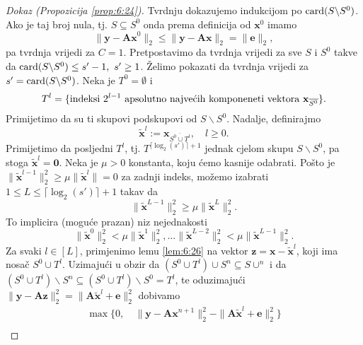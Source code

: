 \documentclass[a4paper,twoside,12pt]{memoir} %
\newcommand{\vect}[1]{\mathbf{#1}}
\renewcommand{\vec}{\vect}
\newcommand{\card}{\text{\normalfont{card}}}
\newcommand{\norm}[1]{\|{#1}\|}
\begin{document}
\begin{proof}[Dokaz (Propozicija \ref{prop:6:24})]
    Tvrdnju dokazujemo indukcijom po $\card(S \backslash S^0)$. Ako je taj broj nula, tj. $S \subseteq S^0$ onda prema definicija od $\vec x^0$ imamo
    \begin{equation*}
        \norm{\vec y - \vec{Ax}^0}_2 \leq \norm{\vec y - \vec{Ax}}_2 = \norm{\vec e}_2, 
    \end{equation*}
    pa tvrdnja vrijedi za $C=1$. Pretpostavimo da tvrdnja vrijedi za sve $S$ i $S^0$ takve da $\card(S \backslash S^0) \leq s'-1,\ s' \geq 1$. \v{Z}elimo pokazati da tvrdnja vrijedi za $s' = \card(S \backslash S^0)$. Neka je $T^0 = \emptyset$ i 
    \begin{equation*}
        T^l = \{\text{indeksi $ 2^{l-1}$ apsolutno najve\'cih komponeneti vektora }\vec x_{\overline{S^0}}\}. 
    \end{equation*}
    Primijetimo da su ti skupovi podskupovi od $S \backslash S^0$. Nadalje, definirajmo
    \begin{equation*}
        \tilde{\vec x}^l := \vec x_{\overline{S^0 \cup T^l}}, \quad l \geq 0.
    \end{equation*}
    Primijetimo da posljedni $T^l$, tj. $T^{\lceil \log_2(s')\rceil + 1}$ jednak cjelom skupu $S \backslash S^0$, pa stoga $\tilde{\vec x}^l = \vec 0$. Neka je $\mu > 0$ konstanta, koju \'cemo kasnije odabrati. Po\v{s}to je $\norm{\tilde{\vec x}^{l-1}}_2^2 \geq \mu \norm{\tilde{\vec x}^l} = 0$ za zadnji indeks, mo\v{z}emo izabrati $1 \leq L \leq \lceil \log_2(s')\rceil + 1$ takav da
    \begin{equation*}
        \norm{\tilde{\vec x}^{L-1}}_2^2 \geq \mu \norm{\tilde{\vec x}^L}_2^2. 
    \end{equation*}
    To implicira (mogu\'ce prazan) niz nejednakosti
    \begin{equation*}
        \norm{\tilde{\vec x}^0}_2^2 < \mu \norm{\tilde{\vec x}^1}_2^2, \dots \norm{\tilde{\vec x}^{L-2}}_2^2 < \mu \norm{\tilde{\vec x}^{L-1}}_2^2.
    \end{equation*}
    Za svaki $l \in [L]$, primjenimo lemu \ref{lem:6:26} na vektor $\vec z = \vec x - \tilde{\vec x}^l$, koji ima nosa\v{c} $S^0 \cup T^l$. Uzimaju\'ci u obzir da $(S^0 \cup T^l) \cup S^n \subseteq S \cup ^n$ i da $(S^0 \cup T^l) \backslash S^n \subseteq (S^0 \cup T^l) \backslash S^0 = T^l$, te oduzimaju\'ci $\norm{\vec y - \vec{Az}}_2^2 = \norm{\vec A \tilde{\vec x}^l + \vec e}_2^2$ dobivamo
    \begin{align*}
        \max \{0,&\ \norm{\vec y - \vec{Ax}^{n+1}}_2^2 - \norm{\vec{A}\tilde{\vec x}^l + \vec e}_2^2 \}\\[0.5em]

\end{align*}
\end{proof}
\end{document}
